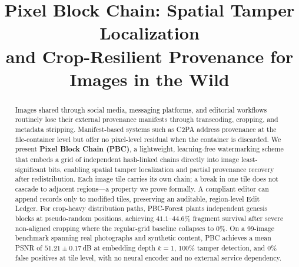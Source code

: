 \documentclass[conference]{IEEEtran}
\begin{document}
\title{Pixel Block Chain: Spatial Tamper Localization\\
and Crop-Resilient Provenance for Images in the Wild}

\author{
  \and
}


\maketitle

\begin{abstract}
Images shared through social media, messaging platforms, and editorial
workflows routinely lose their external provenance manifests through
transcoding, cropping, and metadata stripping. Manifest-based systems
such as C2PA address provenance at the file-container level but offer no
pixel-level residual when the container is discarded. We present
\textbf{Pixel Block Chain (PBC)}, a lightweight, learning-free watermarking
scheme that embeds a grid of independent hash-linked chains directly into
image least-significant bits, enabling spatial tamper localization and
partial provenance recovery after redistribution. Each image tile carries
its own chain; a break in one tile does not cascade to adjacent
regions---a property we prove formally. A compliant editor can append
records only to modified tiles, preserving an auditable, region-level
Edit Ledger. For crop-heavy distribution paths, PBC-Forest plants
independent genesis blocks at pseudo-random positions, achieving
$41.1$--$44.6\%$ fragment survival after severe non-aligned cropping
where the regular-grid baseline collapses to $0\%$. On a 99-image
benchmark spanning real photographs and synthetic content, PBC achieves a
mean PSNR of $51.21 \pm 0.17$\,dB at embedding depth $k{=}1$, $100\%$
tamper detection, and $0\%$ false positives at tile level, with no neural
encoder and no external service dependency.
\end{abstract}
\end{document}
